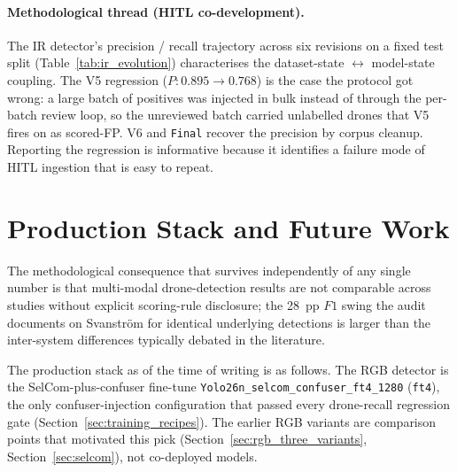 \paragraph{Methodological thread (HITL co-development).}
The IR detector's precision / recall trajectory across six revisions on a fixed test split (Table~\ref{tab:ir_evolution}) characterises the dataset-state $\leftrightarrow$ model-state coupling. The V5 regression ($P: 0.895 \to 0.768$) is the case the protocol got wrong: a large batch of positives was injected in bulk instead of through the per-batch review loop, so the unreviewed batch carried unlabelled drones that V5 fires on as scored-FP. V6 and \texttt{Final} recover the precision by corpus cleanup. Reporting the regression is informative because it identifies a failure mode of HITL ingestion that is easy to repeat.

\section{Production Stack and Future Work}
\label{sec:production_stack}


The methodological consequence that survives independently of any single number is that multi-modal drone-detection results are not comparable across studies without explicit scoring-rule disclosure; the 28~pp $F1$ swing the audit documents on Svanstr\"om for identical underlying detections is larger than the inter-system differences typically debated in the literature.

The production stack as of the time of writing is as follows. The RGB detector is the SelCom-plus-confuser fine-tune \texttt{Yolo26n\_selcom\_confuser\_ft4\_1280} (\texttt{ft4}), the only confuser-injection configuration that passed every drone-recall regression gate (Section~\ref{sec:training_recipes}). The earlier RGB variants are comparison points that motivated this pick (Section~\ref{sec:rgb_three_variants}, Section~\ref{sec:selcom}), not co-deployed models.

